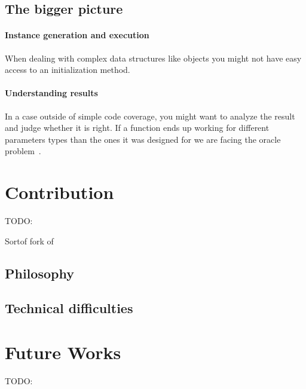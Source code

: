 \documentclass{llncs2e/llncs}
\def\todo#1{{\color{red}TODO:\quad#1}}
\begin{document}
\subsection{The bigger picture}
\paragraph{Instance generation and execution} When dealing with complex data
structures like objects you might not have easy access to an initialization
method.

\paragraph{Understanding results} In a case outside of simple code coverage, you
might want to analyze the result and judge whether it is right. If a function
ends up working for different parameters types than the ones it was designed for
we are facing the oracle problem~\cite{barr2015oracle}.


\section{Contribution}
\label{contribution}
\todo{}

Sortof fork of~\cite{Kim2017ts}

\subsection{Philosophy}
\label{philosophy}

\subsection{Technical difficulties}
\label{tech_difficulties}





\section{Future Works}
\label{futureworks}
\todo{}
\end{document}
